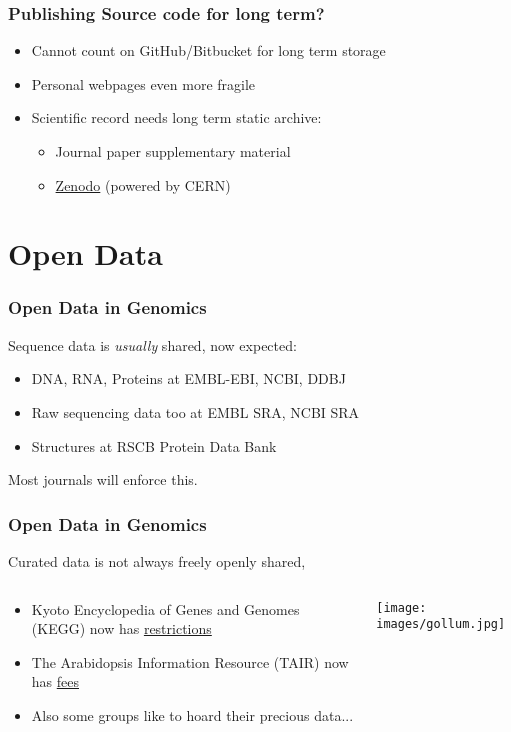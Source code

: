 \begin{frame}
  \frametitle{Publishing Source code for long term?}
  \begin{itemize}
    \item Cannot count on GitHub/Bitbucket for long term storage
    \item Personal webpages even more fragile
    \item Scientific record needs long term static archive:
      \begin{itemize}
        \item Journal paper supplementary material
        \item \href{http://about.zenodo.org/}{Zenodo} (powered by CERN)
      \end{itemize}
  \end{itemize}
\end{frame}

\section{Open Data}

\begin{frame}
  \frametitle{Open Data in Genomics}
  Sequence data is \emph{usually} shared, now expected:
  \begin{itemize}
    \item DNA, RNA, Proteins at EMBL-EBI, NCBI, DDBJ
    \item Raw sequencing data too at EMBL SRA, NCBI SRA
    \item Structures at RSCB Protein Data Bank
  \end{itemize}
  Most journals will enforce this.
\end{frame}

\begin{frame}
  \frametitle{Open Data in Genomics}
  Curated data is not always freely openly shared,
\begin{columns}[T]
\begin{column}{.5\textwidth}
  \begin{itemize}
    \item Kyoto Encyclopedia of Genes and Genomes (KEGG) now has \href{http://www.kegg.jp/kegg/legal.html}{restrictions}
    \item The Arabidopsis Information Resource (TAIR) now has \href{https://www.arabidopsis.org/doc/about/tair_subscriptions/413}{fees}
    \item Also some groups like to hoard their precious data...
  \end{itemize}
\end{column}
\begin{column}{.5\textwidth}
  \texttt{[image: images/gollum.jpg]}
\end{column}
\end{columns}
\end{frame}


